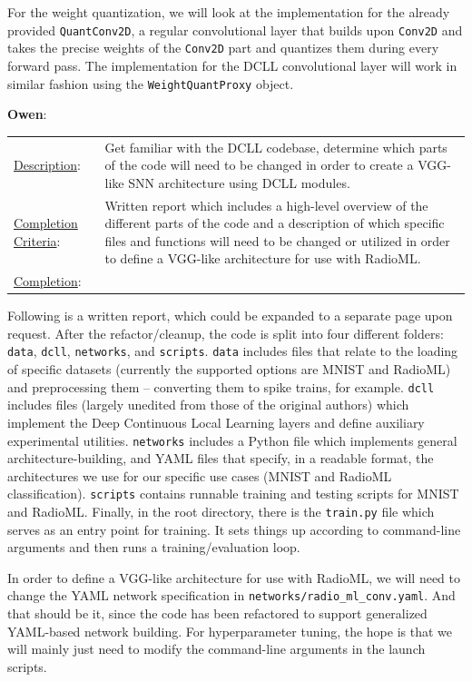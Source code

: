 \documentclass[parskip=true, 10pt]{scrartcl}
\begin{document}
For the weight quantization, we will look at the implementation for the already provided \texttt{QuantConv2D}, a regular convolutional layer that builds upon \texttt{Conv2D} and takes the precise weights of the \texttt{Conv2D} part and quantizes them
during every forward pass. The implementation for the DCLL convolutional layer will work in similar fashion using
the \texttt{WeightQuantProxy} object.

\textsf{\textbf{Owen}}:

\begin{tabularx}{\textwidth}{p{3.5cm} p{10cm}}
\underline{Description}: & Get familiar with the DCLL codebase, determine which parts of the code will need to be changed in order to create a VGG-like SNN architecture using DCLL modules.\\

\underline{Completion Criteria}: & Written report which includes a high-level overview of the different parts of the code and a description of which specific files and functions will need to be changed or utilized in order to define a VGG-like architecture for use with RadioML.\\
\underline{Completion}: &
\end{tabularx}

Following is a written report, which could be expanded to a separate page upon request. After the refactor/cleanup, the code is split into four different folders: {\tt data}, {\tt dcll}, {\tt networks}, and {\tt scripts}. {\tt data} includes files that relate to the loading of specific datasets (currently the supported options are MNIST and RadioML) and preprocessing them -- converting them to spike trains, for example. {\tt dcll} includes files (largely unedited from those of the original authors) which implement the Deep Continuous Local Learning layers and define auxiliary experimental utilities. {\tt networks} includes a Python file which implements general architecture-building, and YAML files that specify, in a readable format, the architectures we use for our specific use cases (MNIST and RadioML classification). {\tt scripts} contains runnable training and testing scripts for MNIST and RadioML. Finally, in the root directory, there is the {\tt train.py} file which serves as an entry point for training. It sets things up according to command-line arguments and then runs a training/evaluation loop.

In order to define a VGG-like architecture for use with RadioML, we will need to change the YAML network specification in {\tt networks/radio\_ml\_conv.yaml}. And that should be it, since the code has been refactored to support generalized YAML-based network building. For hyperparameter tuning, the hope is that we will mainly just need to modify the command-line arguments in the launch scripts.
\end{document}
